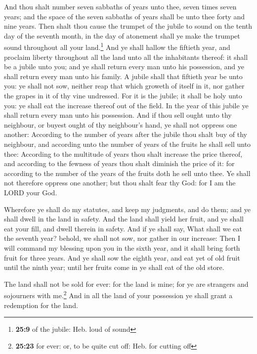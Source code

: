  And thou shalt number seven sabbaths of years unto thee,
seven times seven years; and the space of the seven sabbaths of years
shall be unto thee forty and nine years.  Then shalt thou
cause the trumpet of the jubile to sound on the tenth day of the seventh
month, in the day of atonement shall ye make the trumpet sound
throughout all your land.\footnote{\textbf{25:9} of the jubile: Heb.
  loud of sound}  And ye shall hallow the fiftieth year,
and proclaim liberty throughout all the land unto all the inhabitants
thereof: it shall be a jubile unto you; and ye shall return every man
unto his possession, and ye shall return every man unto his family.
 A jubile shall that fiftieth year be unto you: ye shall
not sow, neither reap that which groweth of itself in it, nor gather the
grapes in it of thy vine undressed.  For it is the
jubile; it shall be holy unto you: ye shall eat the increase thereof out
of the field.  In the year of this jubile ye shall return
every man unto his possession.  And if thou sell ought
unto thy neighbour, or buyest ought of thy neighbour's hand, ye shall
not oppress one another:  According to the number of
years after the jubile thou shalt buy of thy neighbour, and according
unto the number of years of the fruits he shall sell unto thee:
 According to the multitude of years thou shalt increase
the price thereof, and according to the fewness of years thou shalt
diminish the price of it: for according to the number of the years of
the fruits doth he sell unto thee.  Ye shall not
therefore oppress one another; but thou shalt fear thy God: for I am the
LORD your God.

 Wherefore ye shall do my statutes, and keep my
judgments, and do them; and ye shall dwell in the land in safety.
 And the land shall yield her fruit, and ye shall eat
your fill, and dwell therein in safety.  And if ye shall
say, What shall we eat the seventh year? behold, we shall not sow, nor
gather in our increase:  Then I will command my blessing
upon you in the sixth year, and it shall bring forth fruit for three
years.  And ye shall sow the eighth year, and eat yet of
old fruit until the ninth year; until her fruits come in ye shall eat of
the old store.

 The land shall not be sold for ever: for the land is
mine; for ye are strangers and sojourners with me.\footnote{\textbf{25:23}
  for ever: or, to be quite cut off: Heb. for cutting off}
 And in all the land of your possession ye shall grant a
redemption for the land.


